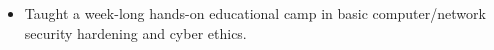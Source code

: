 %
{
    \begin{itemize}
        \item Taught a week-long hands-on educational camp in basic
              computer/network security hardening and cyber ethics.
    \end{itemize}
}
%
